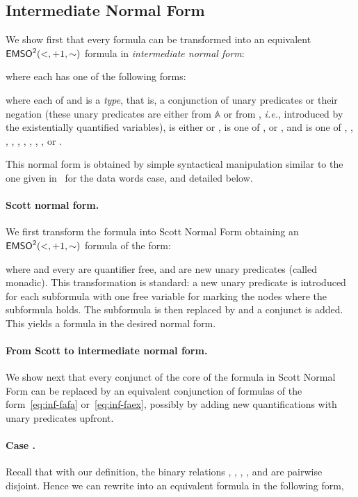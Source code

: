 \documentclass{CSML}
\newcommand\neighbor{\ensuremath{\mathord{+}1}}
\newcommand\descendant{\ensuremath{\mathord{<}}}
\newcommand\emsotwo{\ensuremath{\emso^2(\descendant,\neighbor,\mathord{\sim})}\xspace}
\newcommand\A{\ensuremath{\mathbb{A}}\xspace}
\begin{document}
\subsection{Intermediate Normal Form} \label{app:normal-form}
We show first that every \fotwo formula  can be transformed into an equivalent \emsotwo formula
in \emph{intermediate normal form}:

where each  has one of the following forms:

where each of  and  is a \emph{type}, 
that is, a conjunction of unary predicates or their negation 
(these unary predicates are either from \A or from , 
\textit{i.e.}, introduced by the existentially quantified variables),
 is either  or ,
 is one of 
      ,  
      or ,
and
 is one of
, 
, 
, 
,
,
, 
, 
,
,
 or .

This normal form is obtained by simple syntactical manipulation 
similar to the one given in~\cite{BDMSS11} for the data words case, and detailed below. 

\paragraph{\bf Scott normal form.}
We first transform the formula  into Scott Normal Form
obtaining an \emsotwo formula of the form:

where  and every  are quantifier free, 
and  are new unary predicates (called monadic).
This transformation is standard: 
a new unary predicate  is introduced
for each subformula  with one free variable for marking the
nodes where the subformula holds. The subformula  is then
replaced by  and a conjunct 
 is added. 
This yields a formula in the desired normal form.

\paragraph{\bf From Scott to intermediate normal form.}
We show next that every conjunct of the core of the formula  in Scott Normal Form
can be replaced by an equivalent conjunction of formulas of the
form~\eqref{eq:inf-fafa} or~\eqref{eq:inf-faex}, possibly by adding 
new quantifications with unary predicates upfront.


\paragraph{\bf Case .}
Recall that with our definition, the binary relations , ,
, ,  and  are pairwise disjoint.
Hence we can rewrite  into an equivalent \fotwo formula 
in the following form,
\end{document}
